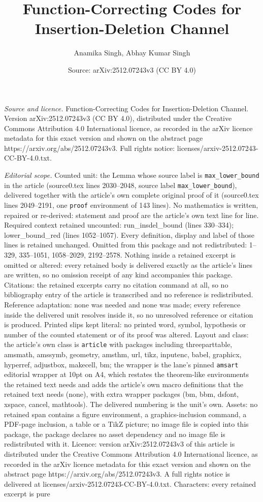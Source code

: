 \documentclass[10pt,a4paper]{amsart}
\title[Function-Correcting Codes for Insertion-Deletion Channel]{Function-Correcting Codes for Insertion-Deletion Channel}
\author{Anamika Singh, Abhay Kumar Singh}
\date{Source: arXiv:2512.07243v3 (CC BY 4.0)}
\begin{document}
\maketitle

\noindent\emph{Source and licence.} Function-Correcting Codes for Insertion-Deletion Channel. Version arXiv:2512.07243v3 (CC BY 4.0), distributed under the Creative Commons Attribution 4.0 International licence, as recorded in the arXiv licence metadata for this exact version and shown on the abstract page https://arxiv.org/abs/2512.07243v3. Full rights notice: licenses/arxiv-2512.07243-CC-BY-4.0.txt.\par\smallskip

\noindent\textit{Editorial scope.} Counted unit: the Lemma whose source label is \texttt{max\_lower\_bound} in the article (source0.tex lines 2030--2048, source label \texttt{max\_lower\_bound}), delivered together with the article's own complete original proof of it (source0.tex lines 2049--2191, one \texttt{proof} environment of 143 lines). No mathematics is written, repaired or re-derived: statement and proof are the article's own text line for line. Required context retained uncounted: run\_insdel\_bound (lines 330--334); lower\_bound\_red (lines 1052--1057). Every definition, display and label of those lines is retained unchanged. Omitted from this package and not redistributed: 1--329, 335--1051, 1058--2029, 2192--2578. Nothing inside a retained excerpt is omitted or altered: every retained body is delivered exactly as the article's lines are written, so no omission receipt of any kind accompanies this package. Citations: the retained excerpts carry no citation command at all, so no bibliography entry of the article is transcribed and no reference is redistributed. Reference adaptation: none was needed and none was made; every reference inside the delivered unit resolves inside it, so no unresolved reference or citation is produced. Printed slips kept literal: no printed word, symbol, hypothesis or number of the counted statement or of its proof was altered. Layout and class: the article's own class is \texttt{article} with packages including threeparttable, amsmath, amssymb, geometry, amsthm, url, tikz, inputenc, babel, graphicx, hyperref, adjustbox, makecell, bm; the wrapper is the lane's pinned \texttt{amsart} editorial wrapper at 10pt on A4, which restates the theorem-like environments the retained text needs and adds the article's own macro definitions that the retained text needs (none), with extra wrapper packages (bm, bbm, dsfont, xspace, cancel, mathtools). The delivered numbering is the unit's own. Assets: no retained span contains a figure environment, a graphics-inclusion command, a PDF-page inclusion, a table or a TikZ picture; no image file is copied into this package, the package declares no asset dependency and no image file is redistributed with it. Licence: version arXiv:2512.07243v3 of this article is distributed under the Creative Commons Attribution 4.0 International licence, as recorded in the arXiv licence metadata for this exact version and shown on the abstract page https://arxiv.org/abs/2512.07243v3. A full rights notice is delivered at licenses/arxiv-2512.07243-CC-BY-4.0.txt. Characters: every retained excerpt is pure 
\end{document}
